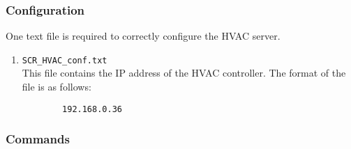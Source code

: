 \documentclass[twoside]{article}
\begin{document}
	\subsubsection{Configuration}
	One text file is required to correctly configure the HVAC server.
	
	\begin{enumerate}
		\item \verb|SCR_HVAC_conf.txt|\\
		This file contains the IP address of the HVAC controller. The format of the file is as follows:
		
		\begin{verbatim}
		192.168.0.36
		\end{verbatim}
		
	\end{enumerate}
	
	\subsubsection{Commands}
	
\end{document}
